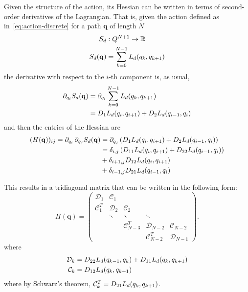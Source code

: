Given the structure of the action, its Hessian can be written in terms of second-order derivatives of the Lagrangian. That is, given the action defined as in~\eqref{eq:action-discrete} for a path $\mathbf{q}$ of length $N$
\begin{align*}
    S_d & : Q^{N+1} \to {\mathbb{R}} \\ 
    S_d (\mathbf{q}) & = \sum_{k=0}^{N-1} L_d(q_k, q_{k+1})
\end{align*}
the derivative with respect to the $i$-th component is, as usual,
\begin{align*}
	\partial_{q_i} S_d (\mathbf{q}) & = \partial_{q_i} \sum_{k=0}^{N-1} L_d(q_k, q_{k+1})           \\
	                          & = D_{1} L_d(q_i, q_{i+1}) + D_{2} L_d(q_{i-1}, q_i)
\end{align*}
and then the entries of the Hessian are
\begin{align*}
	(H (\mathbf{q}))_{ij} = \pdv{S_d}!{q_i, q_j}(\mathbf{q})
	& = \pdv{\left(D_{1} L_d(q_i, q_{i+1}) + D_{2} L_d(q_{i-1}, q_i)\right)}!{q_j}          \\
	& = \delta_{i, j} \left( D_{11}{L_d}(q_i, q_{i+1}) + D_{22}{L_d}(q_{i - 1}, q_i) \right) \\
	& + \delta_{i+1,j} D_{12}{L_d}(q_i, q_{i+1})                                               \\
	& + \delta_{i-1,j} D_{21}{L_d}(q_{i-1}, q_i)
\end{align*}

This results in a tridiagonal matrix that can be written in the following form:
\begin{equation}
	H(\mathbf{q}) = \begin{pmatrix}
		\mathcal{D}_1       & \mathcal{C}_{1} &                         &                         &                     \\
		\mathcal{C}_{1}^{T} & \mathcal{D}_2   & \mathcal{C}_{2}         &                         &                     \\
		                    & \ddots          & \ddots                  & \ddots                  &                     \\
		                    &                 & \mathcal{C}_{N - 3}^{T} & \mathcal{D}_{N - 2}     & \mathcal{C}_{N - 2} \\
		                    &                 &                         & \mathcal{C}_{N - 2}^{T} & \mathcal{D}_{N - 1}
	\end{pmatrix}.
	\label{eq:hessian-matrix}
\end{equation}
where
\begin{equation}
	\begin{aligned}
		\mathcal{D}_k & = D_{22} L_d(q_{k-1}, q_k) + D_{11} L_d(q_k, q_{k+1}) \\
		\mathcal{C}_k & = D_{12} L_d(q_k, q_{k+1})
	\end{aligned}
	\label{eq:hessian-terms-1}
\end{equation}
where by Schwarz's theorem, $\mathcal{C}_k^T = D_{21} L_d(q_k, q_{k+1})$.




